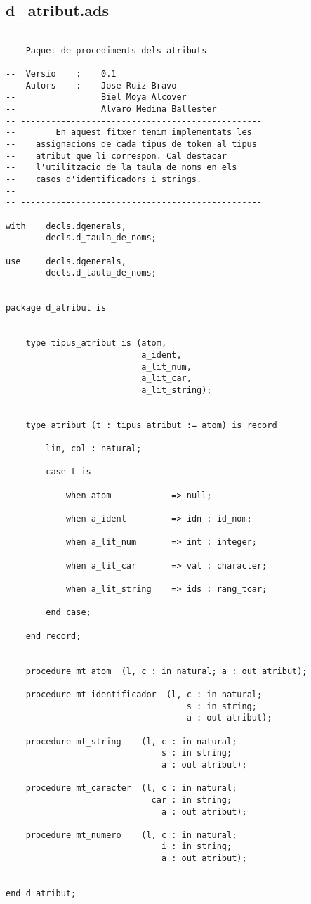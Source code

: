 \documentclass[10pt]{report}
\begin{document}
    \subsection{d\_atribut.ads}
    \begin{lstlisting}[style=Ada]
-- ------------------------------------------------
--  Paquet de procediments dels atributs
-- ------------------------------------------------
--  Versio    :    0.1
--  Autors    :    Jose Ruiz Bravo
--                 Biel Moya Alcover
--                 Alvaro Medina Ballester
-- ------------------------------------------------
--        En aquest fitxer tenim implementats les 
--    assignacions de cada tipus de token al tipus
--    atribut que li correspon. Cal destacar 
--    l'utilitzacio de la taula de noms en els
--    casos d'identificadors i strings.
--
-- ------------------------------------------------

with    decls.dgenerals,
        decls.d_taula_de_noms;
        
use     decls.dgenerals,
        decls.d_taula_de_noms;


package d_atribut is


    type tipus_atribut is (atom,
                           a_ident,
                           a_lit_num,
                           a_lit_car,
                           a_lit_string);
                            
                            
    type atribut (t : tipus_atribut := atom) is record
        
        lin, col : natural;
        
        case t is
        
            when atom            => null;
            
            when a_ident         => idn : id_nom;
            
            when a_lit_num       => int : integer;
            
            when a_lit_car       => val : character;    
            
            when a_lit_string    => ids : rang_tcar;
            
        end case;
                
    end record;
    
    
    procedure mt_atom  (l, c : in natural; a : out atribut);
    
    procedure mt_identificador  (l, c : in natural; 
                                    s : in string; 
                                    a : out atribut);
    
    procedure mt_string    (l, c : in natural; 
                               s : in string; 
                               a : out atribut);
    
    procedure mt_caracter  (l, c : in natural; 
                             car : in string; 
                               a : out atribut);
    
    procedure mt_numero    (l, c : in natural; 
                               i : in string; 
                               a : out atribut);
        
    
end d_atribut;
    \end{lstlisting}
\end{document}
